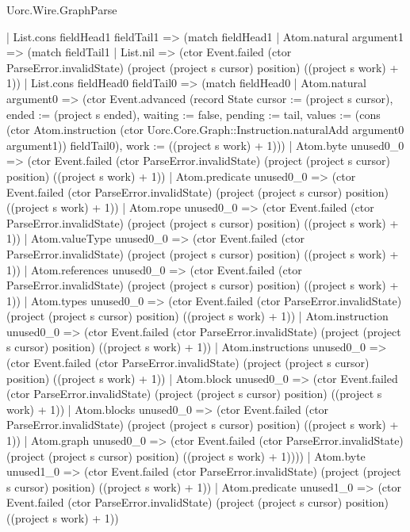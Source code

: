 \begin{lexlean}{Uorc.Wire.GraphParse}
\begin{semanticmodule}
{        | List.cons fieldHead1 fieldTail1 => (match fieldHead1
          | Atom.natural argument1 => (match fieldTail1
            | List.nil => (ctor Event.failed (ctor ParseError.invalidState) (project (project s cursor) position) ((project s work) + 1))
            | List.cons fieldHead0 fieldTail0 => (match fieldHead0
              | Atom.natural argument0 => (ctor Event.advanced (record State {cursor := (project s cursor), ended := (project s ended), waiting := false, pending := tail, values := (cons (ctor Atom.instruction (ctor Uorc.Core.Graph::Instruction.naturalAdd argument0 argument1)) fieldTail0), work := ((project s work) + 1)}))
              | Atom.byte unused0_0 => (ctor Event.failed (ctor ParseError.invalidState) (project (project s cursor) position) ((project s work) + 1))
              | Atom.predicate unused0_0 => (ctor Event.failed (ctor ParseError.invalidState) (project (project s cursor) position) ((project s work) + 1))
              | Atom.rope unused0_0 => (ctor Event.failed (ctor ParseError.invalidState) (project (project s cursor) position) ((project s work) + 1))
              | Atom.valueType unused0_0 => (ctor Event.failed (ctor ParseError.invalidState) (project (project s cursor) position) ((project s work) + 1))
              | Atom.references unused0_0 => (ctor Event.failed (ctor ParseError.invalidState) (project (project s cursor) position) ((project s work) + 1))
              | Atom.types unused0_0 => (ctor Event.failed (ctor ParseError.invalidState) (project (project s cursor) position) ((project s work) + 1))
              | Atom.instruction unused0_0 => (ctor Event.failed (ctor ParseError.invalidState) (project (project s cursor) position) ((project s work) + 1))
              | Atom.instructions unused0_0 => (ctor Event.failed (ctor ParseError.invalidState) (project (project s cursor) position) ((project s work) + 1))
              | Atom.block unused0_0 => (ctor Event.failed (ctor ParseError.invalidState) (project (project s cursor) position) ((project s work) + 1))
              | Atom.blocks unused0_0 => (ctor Event.failed (ctor ParseError.invalidState) (project (project s cursor) position) ((project s work) + 1))
              | Atom.graph unused0_0 => (ctor Event.failed (ctor ParseError.invalidState) (project (project s cursor) position) ((project s work) + 1))))
          | Atom.byte unused1_0 => (ctor Event.failed (ctor ParseError.invalidState) (project (project s cursor) position) ((project s work) + 1))
          | Atom.predicate unused1_0 => (ctor Event.failed (ctor ParseError.invalidState) (project (project s cursor) position) ((project s work) + 1))
}
\end{semanticmodule}
\end{lexlean}
